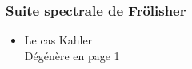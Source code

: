 \documentclass[12pt,makeidx]{amsart}
\begin{document}
\subsubsection{Suite spectrale de Frölisher}
\label{sec-1-6-4}
\begin{itemize}

\item Le cas Kahler\\
\label{sec-1-6-4-1}%
Dégénère en page 1
\end{itemize} %
\end{document}
